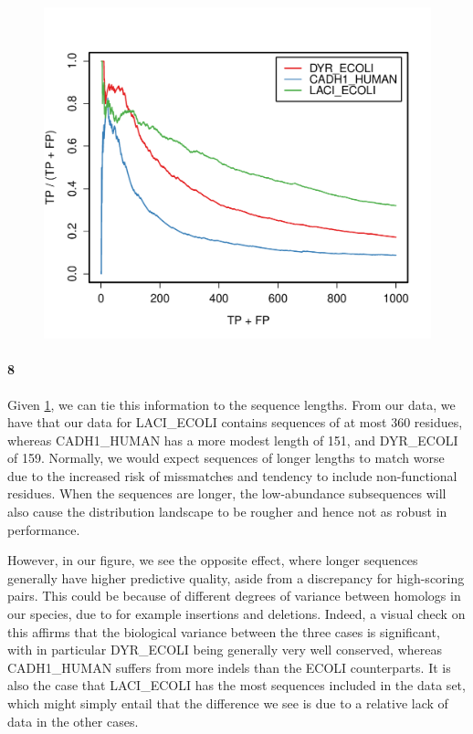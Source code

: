 \documentclass[11pt]{article}\usepackage[]{graphicx}\usepackage[]{color}
\makeatletter
\def\maxwidth{ %
  \ifdim\Gin@nat@width>\linewidth
    \linewidth
  \else
    \Gin@nat@width
  \fi
}
\theoremstyle{plain}
\makeatother
\begin{document}
\begin{multicols*}{2}
\begin{Schunk}
\begin{figure}[H]
{\centering \includegraphics[width=\maxwidth]{figure/twocolumn-otherprot-1} 

}

\caption[ ]{ }\label{fig:otherprot}
\end{figure}
\end{Schunk}
	
	\paragraph{8}
	Given \cref{fig:otherprot}, we can tie this information to the sequence lengths. From our data, we have that our data for LACI\_ECOLI contains sequences of at most 360 residues, whereas CADH1\_HUMAN has a more modest length of 151, and DYR\_ECOLI of 159. Normally, we would expect sequences of longer lengths to match worse due to the increased risk of missmatches and tendency to include non-functional residues. When the sequences are longer, the low-abundance subsequences will also cause the distribution landscape to be rougher and hence not as robust in performance.
	
	However, in our figure, we see the opposite effect, where longer sequences generally have higher predictive quality, aside from a discrepancy for high-scoring pairs. This could be because of different degrees of variance between homologs in our species, due to for example insertions and deletions. Indeed, a visual check on this affirms that the biological variance between the three cases is significant, with in particular DYR\_ECOLI being generally very well conserved, whereas CADH1\_HUMAN suffers from more indels than the ECOLI counterparts. It is also the case that LACI\_ECOLI has the most sequences included in the data set, which might simply entail that the difference we see is due to a relative lack of data in the other cases.
	

\end{multicols*}
\end{document}
